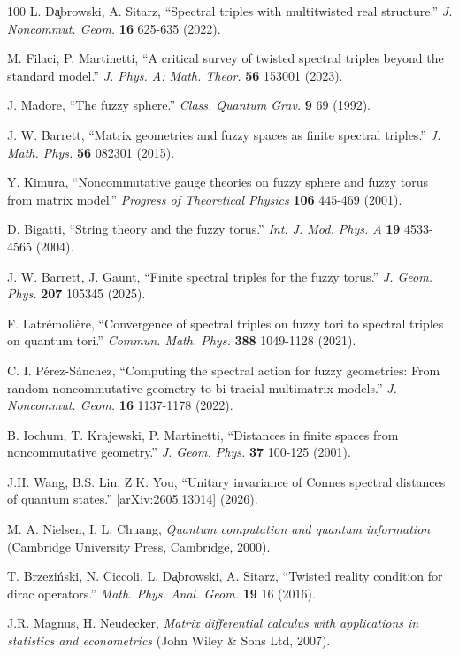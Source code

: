 \documentclass[a4paper,11pt]{article}
\begin{document}
\begin{thebibliography}{100}
	 L. D\c{a}browski, A. Sitarz, ``Spectral triples with multitwisted real structure.'' \textit{J. Noncommut. Geom.} \textbf{16} 625-635 (2022).
			
	 M. Filaci, P. Martinetti, ``A critical survey of twisted spectral triples beyond the standard model.'' \textit{J. Phys. A: Math.
		Theor.} \textbf{56} 153001 (2023).
	
	 J. Madore, ``The fuzzy sphere.''  \textit{Class. Quantum Grav.} \textbf{9} 69 (1992). 
	
	 J. W. Barrett, ``Matrix geometries and fuzzy spaces as finite spectral triples.'' \textit{J. Math. Phys.} \textbf{56} 082301 (2015).
	
	 Y. Kimura, ``Noncommutative gauge theories on fuzzy sphere and fuzzy torus from matrix model.'' \textit{Progress of Theoretical Physics} \textbf{106} 445-469 (2001).
	
	
	 D. Bigatti, ``String theory and the fuzzy torus.'' \textit{Int. J.
	Mod. Phys. A} \textbf{19} 4533-4565 (2004).
	
	 J. W. Barrett, J. Gaunt, ``Finite spectral triples for the fuzzy torus.''
	\textit{J. Geom. Phys.} \textbf{207} 105345 (2025).
	
	 F. Latr\'{e}moli\`{e}re, ``Convergence of spectral triples on fuzzy tori to spectral triples on quantum tori.'' \textit{Commun. Math. Phys.} \textbf{388} 1049-1128	(2021).
	
	 C. I. P\'{e}rez-S\'{a}nchez, ``Computing the spectral action for fuzzy geometries:
	From random noncommutative geometry to bi-tracial multimatrix models.''
	\textit{J. Noncommut. Geom.} \textbf{16} 1137-1178 (2022).
	
	 B. Iochum, T. Krajewski, P. Martinetti, ``Distances in
	finite spaces from noncommutative geometry.'' \textit{J. Geom. Phys.} \textbf{37} 100-125 (2001).
	
	 J.H. Wang, B.S. Lin, Z.K. You, ``Unitary invariance of Connes spectral distances of quantum states.'' [arXiv:2605.13014] (2026).
	
	 M. A. Nielsen, I. L. Chuang, \textit{Quantum
	computation and quantum information} (Cambridge University Press, Cambridge, 2000).
	
	 T. Brzezi\'{n}ski, N. Ciccoli, L. D\c{a}browski, A. Sitarz, ``Twisted reality condition for dirac operators.'' \textit{Math. Phys. Anal. Geom.} \textbf{19} 16 (2016).
	
	 J.R. Magnus, H. Neudecker, \textit{Matrix differential calculus
		with applications in statistics and econometrics} (John Wiley \& Sons Ltd, 2007).
\end{thebibliography}
\end{document}
